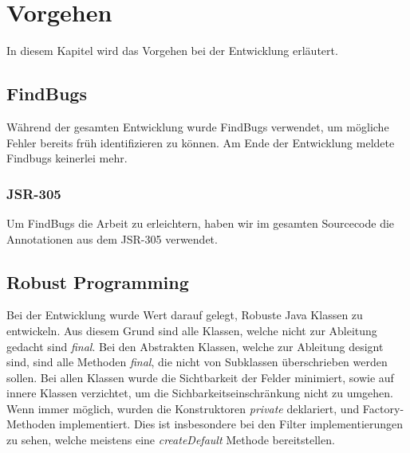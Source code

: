 \section{Vorgehen}

In diesem Kapitel wird das Vorgehen bei der Entwicklung erläutert.

\subsection{FindBugs}

Während der gesamten Entwicklung wurde FindBugs verwendet, um mögliche Fehler bereits 
früh identifizieren zu können. Am Ende der Entwicklung meldete Findbugs keinerlei mehr.

\subsubsection{JSR-305}

Um FindBugs die Arbeit zu erleichtern, haben wir im gesamten Sourcecode die Annotationen aus dem JSR-305 
verwendet.
\subsection{Robust Programming}

Bei der Entwicklung wurde Wert darauf gelegt, Robuste Java Klassen zu entwickeln. Aus diesem Grund 
sind alle Klassen, welche nicht zur Ableitung gedacht sind \textit{final}. Bei den Abstrakten Klassen,
welche zur Ableitung designt sind, sind alle Methoden \textit{final}, die nicht von Subklassen überschrieben
werden sollen. Bei allen Klassen wurde die Sichtbarkeit der Felder minimiert, sowie auf innere Klassen 
verzichtet, um die Sichbarkeitseinschränkung nicht zu umgehen. Wenn immer möglich, wurden die 
Konstruktoren \textit{private} deklariert, und Factory-Methoden implementiert. Dies ist insbesondere
bei den Filter implementierungen zu sehen, welche meistens eine \textit{createDefault} Methode 
bereitstellen.\newline

